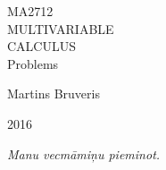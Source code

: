\documentclass[a4paper, 11pt]{article}
\begin{document}

\begin{titlepage}

\newlength{\dropp}
\setlength{\dropp}{0.1\textheight}
\vspace*{1.5\dropp}
\centering

{\fontsize{24}{24}\rmfamily\selectfont MA2712} \\%
{\color{Red} \fontsize{60}{60}\rmfamily\selectfont 
MULTIVARIABLE \\[12pt]
CALCULUS} \\[24pt]
{\fontsize{24}{24}\rmfamily Problems }\par
\vfill
{\fontsize{18}{18}\rmfamily Martins Bruveris}\par
\vfill
{\scshape 2016}\par
\vspace*{\dropp}
\end{titlepage}
\addtocounter{page}{1}

\null\thispagestyle{empty}\newpage


\thispagestyle{empty}
{}

\vspace*{6cm}


\begin{center}
\Large\itshape
Manu vecmāmiņu pieminot.%
\end{center}

\newpage\null\thispagestyle{empty}\newpage


\thispagestyle{firstpage}

\vspace*{3cm}

\tableofcontents

\newpage\null\thispagestyle{empty}\newpage

\end{document}
